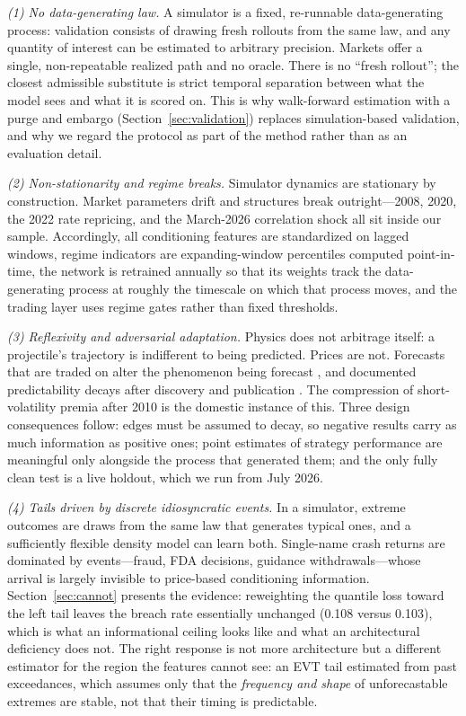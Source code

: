 \documentclass[11pt]{article}
\begin{document}
\emph{(1) No data-generating law.} A simulator is a fixed, re-runnable data-generating process: validation consists of drawing fresh rollouts from the same law, and any quantity of interest can be estimated to arbitrary precision. Markets offer a single, non-repeatable realized path and no oracle. There is no ``fresh rollout''; the closest admissible substitute is strict temporal separation between what the model sees and what it is scored on. This is why walk-forward estimation with a purge and embargo (Section~\ref{sec:validation}) replaces simulation-based validation, and why we regard the protocol as part of the method rather than as an evaluation detail.

\emph{(2) Non-stationarity and regime breaks.} Simulator dynamics are stationary by construction. Market parameters drift and structures break outright---2008, 2020, the 2022 rate repricing, and the March-2026 correlation shock all sit inside our sample. Accordingly, all conditioning features are standardized on lagged windows, regime indicators are expanding-window percentiles computed point-in-time, the network is retrained annually so that its weights track the data-generating process at roughly the timescale on which that process moves, and the trading layer uses regime gates rather than fixed thresholds.

\emph{(3) Reflexivity and adversarial adaptation.} Physics does not arbitrage itself: a projectile's trajectory is indifferent to being predicted. Prices are not. Forecasts that are traded on alter the phenomenon being forecast \citep{timmermanngranger2004, lo2004, lo2017}, and documented predictability decays after discovery and publication \citep{mcleanpontiff2016}. The compression of short-volatility premia after 2010 is the domestic instance of this. Three design consequences follow: edges must be assumed to decay, so negative results carry as much information as positive ones; point estimates of strategy performance are meaningful only alongside the process that generated them; and the only fully clean test is a live holdout, which we run from July 2026.

\emph{(4) Tails driven by discrete idiosyncratic events.} In a simulator, extreme outcomes are draws from the same law that generates typical ones, and a sufficiently flexible density model can learn both. Single-name crash returns are dominated by events---fraud, FDA decisions, guidance withdrawals---whose arrival is largely invisible to price-based conditioning information. Section~\ref{sec:cannot} presents the evidence: reweighting the quantile loss toward the left tail leaves the breach rate essentially unchanged (0.108 versus 0.103), which is what an informational ceiling looks like and what an architectural deficiency does not. The right response is not more architecture but a different estimator for the region the features cannot see: an EVT tail estimated from past exceedances, which assumes only that the \emph{frequency and shape} of unforecastable extremes are stable, not that their timing is predictable.
\end{document}

